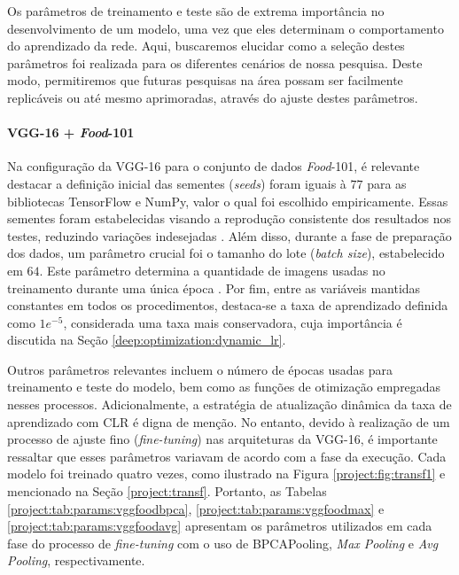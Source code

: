Os parâmetros de treinamento e teste são de extrema importância no desenvolvimento de um modelo, uma vez que eles determinam o comportamento do aprendizado da rede. Aqui, buscaremos elucidar como a seleção destes parâmetros foi realizada para os diferentes cenários de nossa pesquisa. Deste modo, permitiremos que futuras pesquisas na área possam ser facilmente replicáveis ou até mesmo aprimoradas, através do ajuste destes parâmetros.

\paragraph{VGG-16 + \textit{Food}-101}
\label{params:vggfood}
Na configuração da VGG-16 para o conjunto de dados \textit{Food}-101, é relevante destacar a definição inicial das sementes (\textit{seeds}) foram iguais à $77$ para as bibliotecas TensorFlow e NumPy, valor o qual foi escolhido empiricamente. Essas sementes foram estabelecidas visando a reprodução consistente dos resultados nos testes, reduzindo variações indesejadas \citep{Alahmari2020ChallengesModels}. Além disso, durante a fase de preparação dos dados, um parâmetro crucial foi o tamanho do lote (\textit{batch size}), estabelecido em $64$. Este parâmetro determina a quantidade de imagens usadas no treinamento durante uma única época \citep{Kandel2020TheDataset}. Por fim, entre as variáveis mantidas constantes em todos os procedimentos, destaca-se a taxa de aprendizado definida como $1e^{-5}$, considerada uma taxa mais conservadora, cuja importância é discutida na Seção \ref{deep:optimization:dynamic_lr}.

Outros parâmetros relevantes incluem o número de épocas usadas para treinamento e teste do modelo, bem como as funções de otimização empregadas nesses processos. Adicionalmente, a estratégia de atualização dinâmica da taxa de aprendizado com CLR \citep{Smith2017CyclicalNetworks} é digna de menção. No entanto, devido à realização de um processo de ajuste fino (\textit{fine-tuning}) nas arquiteturas da VGG-16, é importante ressaltar que esses parâmetros variavam de acordo com a fase da execução. Cada modelo foi treinado quatro vezes, como ilustrado na Figura \ref{project:fig:transf1} e mencionado na Seção \ref{project:transf}. Portanto, as Tabelas \ref{project:tab:params:vggfoodbpca}, \ref{project:tab:params:vggfoodmax} e \ref{project:tab:params:vggfoodavg} apresentam os parâmetros utilizados em cada fase do processo de \textit{fine-tuning} com o uso de BPCAPooling, \textit{Max Pooling} e \textit{Avg Pooling}, respectivamente.

